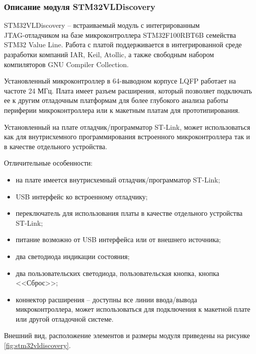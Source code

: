     \subsubsection{Описание модуля STM32VLDiscovery}
        STM32VLDiscovery -- встраиваемый модуль с интегрированным\\
        JTAG-отладчиком на базе микроконтроллера STM32F100RBT6B семейства STM32
        Value Line. Работа с платой поддерживается в интегрированной среде
        разработки компаний IAR, Keil, Atollic, а также свободным набором
        компиляторов GNU Compiler Collection.

        Установленный микроконтроллер в 64-выводном корпусе LQFP работает на
        частоте 24 МГц. Плата имеет разъем расширения, который позволяет
        подключать ее к другим отладочным платформам для более глубокого
        анализа работы периферии микроконтроллера или к макетным платам для
        прототипирования.

        Установленный на плате отладчик/программатор ST-Link, может
        использоваться как для внутрисхемного программирования встроенного
        микроконтроллера так и в качестве отдельного устройства.

        Отличительные особенности:
        \begin{itemize}
            \item на плате имеется внутрисхемный отладчик/программатор ST-Link;
            \item USB интерфейс ко встроенному отладчику;
            \item переключатель для использования платы в качестве отдельного
                устройства ST-Link;
            \item питание возможно от USB интерфейса или от внешнего источника; 
            \item два светодиода индикации состояния;
            \item два пользовательских светодиода, пользовательская кнопка,
                кнопка \\ <<Сброс>>;
            \item коннектор расширения – доступны все линии ввода/вывода
                микроконтроллера, может использоваться для подключения к
                макетной плате или другой отладочной системе.
        \end{itemize}

        Внешний вид, расположение элементов и размеры модуля приведены на
        рисунке \ref{fig:stm32vldiscovery}.

